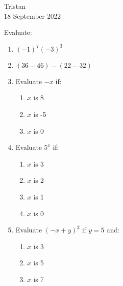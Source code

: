 \documentclass[14pt]{extarticle} %
\begin{document}
\hfill Tristan\\
\null\hfill 18 September 2022

\vspace{10mm}

Evaluate:
\begin{enumerate}[label=\Alph*.), itemsep=\fill]
\item  $(-1)^7(-3)^3$
\item  $(36-46)-(22-32)$
\item Evaluate $-x$ if:
    \begin{enumerate}[itemsep=\fill]
    \item $x$ is 8
    \item $x$ is -5
    \item $x$ is 0
    \end{enumerate}
\vfill\clearpage
\item Evaluate $5^x$ if:
    \begin{enumerate}[itemsep=\fill]
    \item $x$ is 3
    \item $x$ is 2
    \item $x$ is 1
    \item $x$ is 0
    \vfill\end{enumerate}
\item Evaluate $(-x+y)^2$ if $y=5$ and:
    \begin{enumerate}[itemsep=\fill]
    \item $x$ is 3
    \item $x$ is 5
    \item $x$ is 7
    \end{enumerate}
\vfill\end{enumerate}
\end{document}
